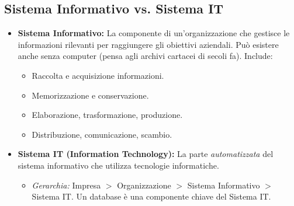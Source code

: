 \subsection{Sistema Informativo vs. Sistema IT}
\begin{itemize}
	\item \textbf{Sistema Informativo:} La componente di un'organizzazione che gestisce le informazioni rilevanti per raggiungere gli obiettivi aziendali. Può esistere anche senza computer (pensa agli archivi cartacei di secoli fa). Include:
	\begin{itemize}
		\item Raccolta e acquisizione informazioni.
		\item Memorizzazione e conservazione.
		\item Elaborazione, trasformazione, produzione.
		\item Distribuzione, comunicazione, scambio.
	\end{itemize}
	\item \textbf{Sistema IT (Information Technology):} La parte \textit{automatizzata} del sistema informativo che utilizza tecnologie informatiche.
	\begin{itemize}
		\item \textit{Gerarchia:} Impresa $>$ Organizzazione $>$ Sistema Informativo $>$ Sistema IT. Un database è una componente chiave del Sistema IT.
	\end{itemize}
\end{itemize}

